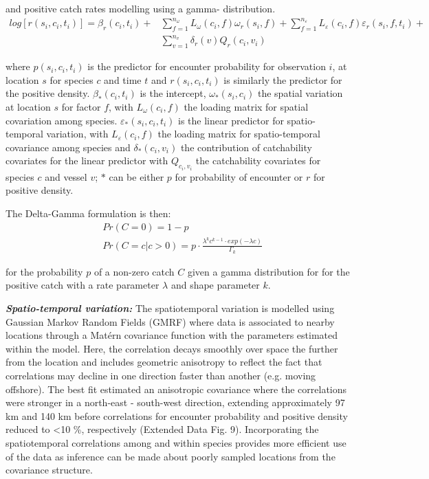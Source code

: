 \documentclass{nature}
\begin{document}
\begin{linenumbers}
and positive catch rates modelling using a gamma- distribution\cite{Thorson2015a}. 
		\begin{equation}
			\begin{split}
			log[r(s_{i},c_{i},t_{i})] = \beta_{r}(c_{i},t_{i}) +
			& \sum\limits_{f=1}^{n_{\omega}} L_{\omega}(c_{i},f)
			\omega_{r}(s_{i},f) +\sum\limits_{f=1}^{n_{\varepsilon}} 
			L_{\varepsilon}(c_{i},f) \varepsilon_{r}(s_{i},f,t_{i}) + \\
			& \sum\limits_{v=1}^{n_{v}}\delta_{r}(v) Q_{r}(c_{i}, v_{i})
			\end{split}
		\end{equation}

where $p(s_{i}, c_{i}, t_{i})$ is the predictor for encounter probability for
observation $i$, at location $s$ for species $c$ and time $t$ and $r(s_{i},
c_{i}, t_{i})$ is similarly the predictor for the positive density.
$\beta_{*}(c_{i},t_{i})$ is the intercept, $\omega_{*}(s_{i},c_{i})$ the
spatial variation at location $s$ for factor $f$, with $L_{\omega}(c_{i},f)$
the loading matrix for spatial covariation among species.
$\varepsilon_{*}(s_{i},c_{i},t_{i})$ is the linear predictor for
spatio-temporal variation, with $L_{\varepsilon}(c_{i}, f)$ the loading matrix
for spatio-temporal covariance among species and $\delta_{*}(c_{i}, v_{i})$ the
contribution of catchability covariates for the linear predictor with
$Q_{c_{i}, v_{i}}$ the catchability covariates for species $c$ and vessel $v$;
$*$ can be either $p$ for probability of encounter or $r$ for positive density.

The Delta-Gamma formulation is then:
\begin{equation}
	\begin{split}
	& Pr(C = 0) = 1 - p \\
	& Pr(C = c | c > 0) = p \cdot \frac{\lambda^{k}c^{k-1} \cdot exp(-\lambda c)}{\Gamma_{k}}
	\end{split}
\end{equation}

for the probability $p$ of a non-zero catch $C$ given a gamma distribution for
for the positive catch with a rate parameter $\lambda$ and shape parameter $k$.

\textbf{\textit{Spatio-temporal variation:}} The spatiotemporal variation is
modelled using Gaussian Markov Random Fields (GMRF) where data is associated to
nearby locations through a Matérn covariance function with the parameters
estimated within the model. Here, the correlation decays smoothly over space
the further from the location and includes geometric anisotropy to reflect the
fact that correlations may decline in one direction faster than another (e.g.
moving offshore)\cite{Thorson2013}.  The best fit estimated an anisotropic
covariance where the correlations were stronger in a north-east - south-west
direction, extending approximately 97 km and 140 km before correlations for
encounter probability and positive density reduced to \textless 10 \%,
respectively (Extended Data Fig. 9). Incorporating the spatiotemporal
correlations among and within species provides more efficient use of the data
as inference can be made about poorly sampled locations from the covariance
structure.


\end{linenumbers}
\end{document}

